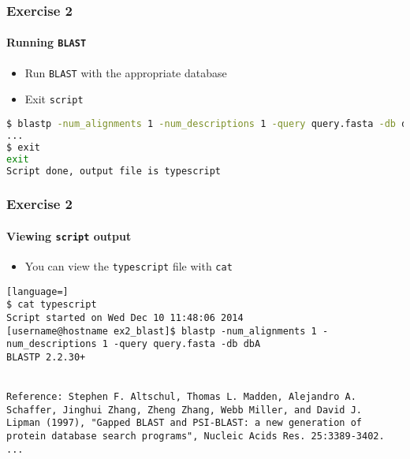 \begin{frame}[fragile]
  \frametitle{Exercise 2}
  \framesubtitle{Running \texttt{BLAST}}
  \begin{itemize}
    \item Run \texttt{BLAST} with the appropriate database
    \item Exit \texttt{script}
  \end{itemize}
\begin{lstlisting}[language=bash]
$ blastp -num_alignments 1 -num_descriptions 1 -query query.fasta -db dbA
...
$ exit
exit
Script done, output file is typescript
\end{lstlisting}    
\end{frame}

\begin{frame}[fragile]
  \frametitle{Exercise 2}
  \framesubtitle{Viewing \texttt{script} output}
  \begin{itemize}
    \item You can view the \texttt{typescript} file with \texttt{cat}
  \end{itemize}
\begin{lstlisting}[language=]
$ cat typescript
Script started on Wed Dec 10 11:48:06 2014
[username@hostname ex2_blast]$ blastp -num_alignments 1 -num_descriptions 1 -query query.fasta -db dbA
BLASTP 2.2.30+


Reference: Stephen F. Altschul, Thomas L. Madden, Alejandro A.
Schaffer, Jinghui Zhang, Zheng Zhang, Webb Miller, and David J.
Lipman (1997), "Gapped BLAST and PSI-BLAST: a new generation of
protein database search programs", Nucleic Acids Res. 25:3389-3402.
...
\end{lstlisting}    
\end{frame}


